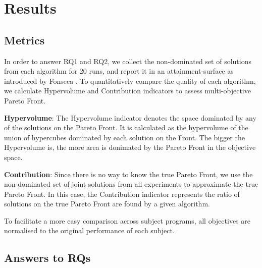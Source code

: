 
\section{Results}
\label{sec_results}
\subsection{Metrics}
\label{sec_matrics}

In order to answer RQ1 and RQ2, we collect the non-dominated set of solutions from each algorithm for 20 runs, and report it in an attainment-surface as introduced by Fonseca \cite{attainment_surface:1996}. To quantitatively compare the quality of each algorithm, we calculate Hypervolume and Contribution indicators to assess multi-objective Pareto Front.

\textbf{Hypervolume}: The Hypervolume indicator \cite{797969} denotes the space dominated by any of the solutions on the Pareto Front. It is calculated as the hypervolume of the union of hypercubes dominated by each solution on the Front. The bigger the Hypervolume is, the more area is donimated by the Pareto Front in the objective space.

\textbf{Contribution}: Since there is no way to know the true Pareto Front, we use the non-dominated set of joint solutions from all experiments to approximate the true Pareto Front. In this case, the Contribution indicator represents the ratio of solutions on the true Pareto Front are found by a given algorithm.


To facilitate a more easy comparison across subject programs, all objectives are normalised to the original performance of each subject.

\subsection{Answers to RQs}
\label{sec_answers}

\newcommand{\shallow}{Sha}
\newcommand{\all}{All}
\newcommand{\randomsearch}{Rand}
\newcommand{\nsgaii}{NSGA}
\newcommand{\sr}{\emph{\shallow\randomsearch}}
\newcommand{\sn}{\emph{\shallow\nsgaii}}
\newcommand{\dr}{\emph{\all\randomsearch}}
\newcommand{\dn}{\emph{\all\nsgaii}}

